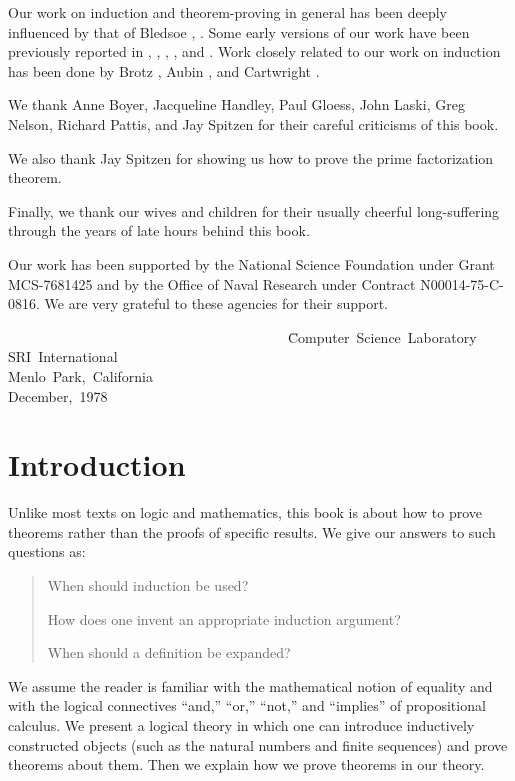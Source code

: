 \documentclass[11pt]{book}
\newenvironment{pubcrown}{\begin{quote}}{\end{quote}}
\newcommand{\pubdefaulttextsize}{\large}
\begin{document}
Our work on induction and theorem-proving in general  has been deeply influenced by
that of Bledsoe \cite{BLEDSOEPROVER}, \cite{BLEDSOELIMIT}.
Some early versions of our work have
been previously reported in \cite{JACM}, \cite{THESIS},
\cite{SIGART}, \cite{IEEE}, and
\cite{IJCAI77}.  Work closely related to
our work on induction has been done by
Brotz \cite{BROTZ}, Aubin \cite{AUBIN}, and Cartwright \cite{CARTWRIGHT}.

We thank Anne Boyer, Jacqueline Handley, Paul Gloess, John Laski, Greg Nelson, 
Richard Pattis, and Jay Spitzen for their
careful criticisms of this book.

We also thank Jay Spitzen for showing us how to prove the prime
factorization theorem.

Finally, we thank our wives and children for their usually cheerful
long-suffering through the years of late hours behind this book.

Our work has been supported by the National Science Foundation under
Grant MCS-7681425 and by the Office of Naval Research under Contract
N00014-75-C-0816.  We are very grateful to these agencies for their
support.
\begin{tabbing}
~~~~~~~~~~~~~~~~~~~~~~~~~~~~~~~~~~~~~~~~\=Computer~Science~Laboratory\\
\>SRI~International\\
\>Menlo~Park,~California\\
\>December,~1978\\
\end{tabbing}
\mainmatter
\chapter{Introduction}
\pubdefaulttextsize
Unlike most texts on logic and mathematics, this book is about
how to prove theorems rather than the proofs of specific results.
We give our answers to such questions as:
\begin{pubcrown}
When should induction be used?

How does one invent an appropriate induction argument?

When should a definition be expanded?
\end{pubcrown}

We assume the reader is familiar with the mathematical
notion of equality and with the logical connectives ``and,'' ``or,'' ``not,''
and ``implies'' of propositional calculus.  We present a logical theory
in which one can introduce inductively constructed objects (such as the
natural numbers and finite sequences) and prove theorems
about them.  Then we explain how we prove theorems in our theory.
\end{document}
